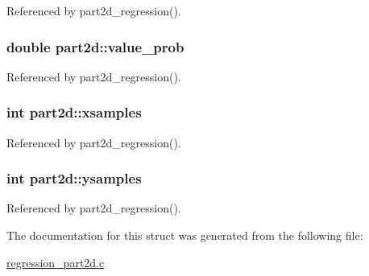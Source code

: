 Referenced by part2d\+\_\+regression().

\subsubsection[{\texorpdfstring{value\+\_\+prob}{value_prob}}]{\setlength{\rightskip}{0pt plus 5cm}double part2d\+::value\+\_\+prob}\hypertarget{structpart2d_a857e8dc79c4805d6e36dd1081ee6ca7e}{}\label{structpart2d_a857e8dc79c4805d6e36dd1081ee6ca7e}


Referenced by part2d\+\_\+regression().

\subsubsection[{\texorpdfstring{xsamples}{xsamples}}]{\setlength{\rightskip}{0pt plus 5cm}int part2d\+::xsamples}\hypertarget{structpart2d_a0c3b43615615bca4c6921b3f7412797b}{}\label{structpart2d_a0c3b43615615bca4c6921b3f7412797b}


Referenced by part2d\+\_\+regression().

\subsubsection[{\texorpdfstring{ysamples}{ysamples}}]{\setlength{\rightskip}{0pt plus 5cm}int part2d\+::ysamples}\hypertarget{structpart2d_a386cc57c85c14ade5666b0cc44d97d4e}{}\label{structpart2d_a386cc57c85c14ade5666b0cc44d97d4e}


Referenced by part2d\+\_\+regression().



The documentation for this struct was generated from the following file\+:\begin{DoxyCompactItemize}
\item 
\hyperlink{regression__part2d_8c}{regression\+\_\+part2d.\+c}\end{DoxyCompactItemize}
